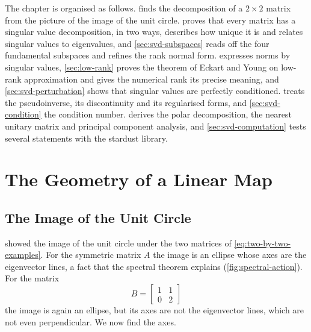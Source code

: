 The chapter is organised as follows.  finds the decomposition of a $2\times2$ matrix from the picture of the image of the unit circle.  proves that every matrix has a singular value decomposition, in two ways, describes how unique it is and relates singular values to eigenvalues, and \cref{sec:svd-subspaces} reads off the four fundamental subspaces and refines the rank normal form.  expresses norms by singular values, \cref{sec:low-rank} proves the theorem of Eckart and Young on low-rank approximation and gives the numerical rank its precise meaning, and \cref{sec:svd-perturbation} shows that singular values are perfectly conditioned.  treats the pseudoinverse, its discontinuity and its regularised forms, and \cref{sec:svd-condition} the condition number.  derives the polar decomposition, the nearest unitary matrix and principal component analysis, and \cref{sec:svd-computation} tests several statements with the stardust library.

\section{The Geometry of a Linear Map}
\label{sec:svd-geometry}

\subsection{The Image of the Unit Circle}

 showed the image of the unit circle under the two matrices of \eqref{eq:two-by-two-examples}. For the symmetric matrix $A$ the image is an ellipse whose axes are the eigenvector lines, a fact that the spectral theorem explains (\cref{fig:spectral-action}). For the matrix
\[
B=\begin{bmatrix}1&1\\0&2\end{bmatrix}
\]
the image is again an ellipse, but its axes are not the eigenvector lines, which are not even perpendicular. We now find the axes.

